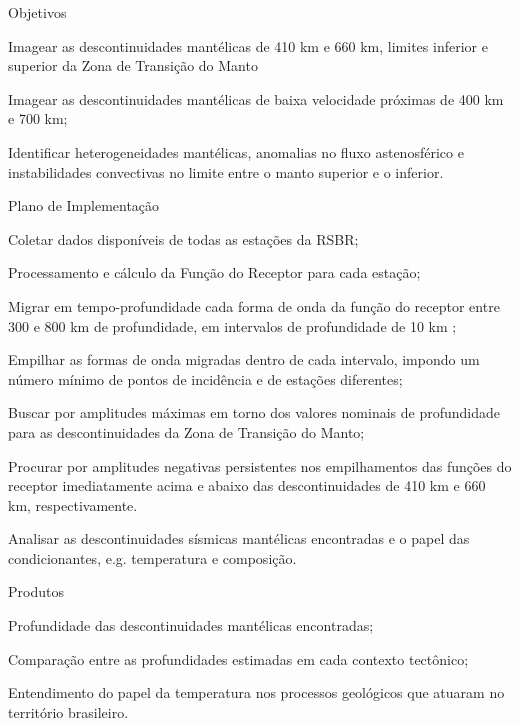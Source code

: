 \documentclass[10pt,a4paper,oneside]{book}
\begin{document}
\begin{fancyenum}{\faFutbol}{Objetivos}
	\item Imagear as descontinuidades mantélicas de 410 km e 660 km, limites inferior e superior da Zona de Transição do Manto
	\item Imagear as descontinuidades mantélicas de baixa velocidade próximas de 400 km e 700 km;
	\item Identificar heterogeneidades mantélicas, anomalias no fluxo astenosférico e instabilidades convectivas no limite entre o manto superior e o inferior.
\end{fancyenum}

\begin{fancyenum}{\faBrain}{Plano de Implementação}
	\item Coletar dados disponíveis de todas as estações da RSBR;
	\item Processamento e cálculo da Função do Receptor para cada estação;
	\item Migrar em tempo-profundidade cada forma de onda da função do receptor entre 300 e 800 km de profundidade, em intervalos de profundidade de 10 km ;
	\item Empilhar as formas de onda migradas dentro de cada intervalo, impondo um número mínimo de pontos de incidência e de estações diferentes;
	\item Buscar por amplitudes máximas em torno dos valores nominais de profundidade para as descontinuidades da Zona de Transição do Manto;
	\item Procurar por amplitudes negativas persistentes nos empilhamentos das funções do receptor imediatamente acima e abaixo das descontinuidades de 410 km e 660 km, respectivamente. 
	\item Analisar as descontinuidades sísmicas mantélicas encontradas e o papel das condicionantes, e.g. temperatura e composição.
\end{fancyenum}

\begin{fancyenum}{\faShoppingCart}{Produtos}
	\item Profundidade das descontinuidades mantélicas encontradas;
	\item Comparação entre as profundidades estimadas em cada contexto tectônico;	
	\item Entendimento do papel da temperatura nos processos geológicos que atuaram no território brasileiro.
\end{fancyenum}
\end{document}
